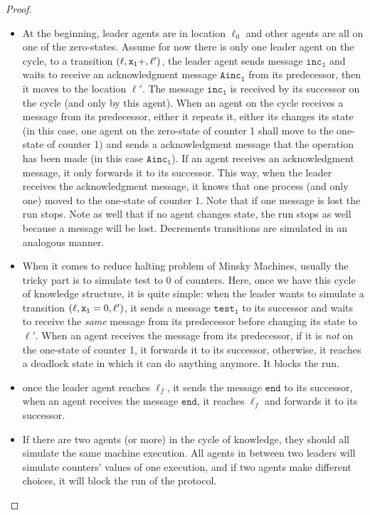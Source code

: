 \begin{proof}
\begin{itemize}
		\item At the beginning, leader agents are in location $\ell_0$ and other agents are all on one of the zero-states. Assume for now there is only one leader agent on the cycle, to a transition $(\ell, \mathtt{\mathtt{x}_1}+, \ell')$, the leader agent sends message $\mathtt{inc_1}$ and waits to receive an acknowledgment message $\mathtt{Ainc_1}$ from its predecessor, then it moves to the location $\ell'$. The message $\mathtt{inc_1}$ is received by its successor on the cycle (and only by this agent). When an agent on the cycle receives a message from its predecessor, either it repeats it, either its changes its state (in this case, one agent on the zero-state of counter 1 shall move to the one-state of counter 1) and sends a acknowledgment message that the operation has been made (in this case $\mathtt{Ainc_1}$). If an agent receives an acknowledgment message, it only forwards it to its successor. This way, when the leader receives the acknowledgment message, it knows that one process (and only one) moved to the one-state of counter 1. Note that if one message is lost the run stops. Note as well that if no agent changes state, the run stops as well because a message will be lost. Decrements transitions are simulated in an analogous manner.
		
		\item When it comes to reduce halting problem of Minsky Machines, usually the tricky part is to simulate test to 0 of counters. Here, once we have this cycle of knowledge structure, it is quite simple: when the leader wants to simulate a transition $(\ell, \mathtt{\mathtt{x}_1}=0, \ell')$, it sends a message $\mathtt{test_1}$ to its successor and waits to receive the \emph{same} message from its predecessor before changing its state to $\ell'$. When an agent receives the message from its predecessor, if it is \emph{not} on the one-state of counter 1, it forwards it to its successor, otherwise, it reaches a deadlock state in which it can do anything anymore. It blocks the run.
		
		\item once the leader agent reaches $\ell_f$, it sends the message $\mathtt{end}$ to its successor, when an agent receives the message $\mathtt{end}$, it reaches $\ell_f$ and forwards it to its successor.
		
		\item If there are two agents (or more) in the cycle of knowledge, they should all simulate the same machine execution. All agents in between two leaders will simulate counters' values of one execution, and if two agents make different choices, it will block the run of the protocol. 
	\end{itemize}
\end{proof}